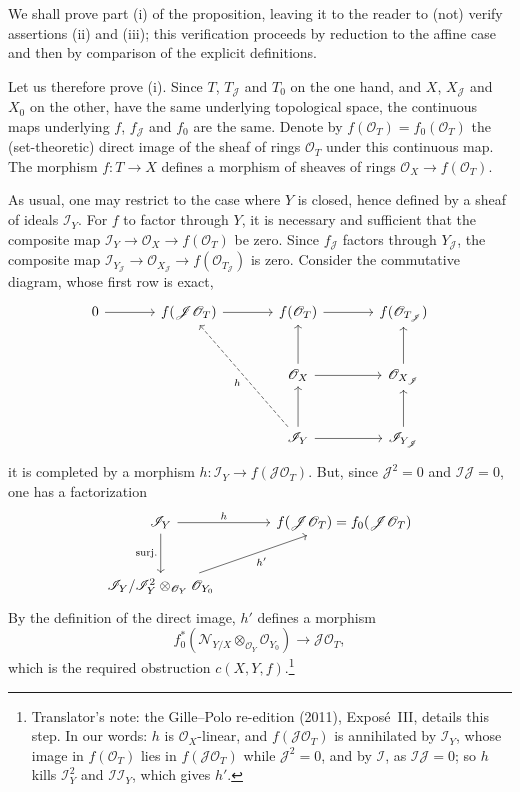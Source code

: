 We shall prove part (i) of the proposition, leaving it to the reader to
(not) verify assertions (ii) and (iii); this verification proceeds by
reduction to the affine case and then by comparison of the explicit
definitions.

Let us therefore prove (i). Since \(T\), \(T_{\mathscr J}\) and \(T_0\) on the
one hand, and \(X\), \(X_{\mathscr J}\) and \(X_0\) on the other, have the same
underlying topological space, the continuous maps underlying \(f\),
\(f_{\mathscr J}\) and \(f_0\) are the same. Denote by
\(f(\mathscr O_T)=f_0(\mathscr O_T)\) the (set-theoretic) direct image of the
sheaf of rings \(\mathscr O_T\) under this continuous map. The morphism
\(f:T\to X\) defines a morphism of sheaves of rings
\(\mathscr O_X\to f(\mathscr O_T)\).

As usual, one may restrict to the case where \(Y\) is closed, hence defined by
a sheaf of ideals \(\mathscr I_Y\). For \(f\) to factor through \(Y\), it is
necessary and sufficient that the composite map
\(\mathscr I_Y\to\mathscr O_X\to f(\mathscr O_T)\) be zero. Since
\(f_{\mathscr J}\) factors through \(Y_{\mathscr J}\), the composite map
\(\mathscr I_{Y_{\mathscr J}}\to\mathscr O_{X_{\mathscr J}}\to
f(\mathscr O_{T_{\mathscr J}})\) is zero. Consider the commutative diagram, whose
first row is exact,
\[
\begin{tikzcd}[column sep=large,row sep=large]
 0\arrow[r]&f(\mathscr J\mathscr O_T)\arrow[r]&f(\mathscr O_T)\arrow[r]
   &f(\mathscr O_{T_{\mathscr J}})\\
 &&\mathscr O_X\arrow[u]\arrow[r]&\mathscr O_{X_{\mathscr J}}\arrow[u]\\
 &&\mathscr I_Y\arrow[u]\arrow[r]\arrow[uul,dashed,"h"]
   &\mathscr I_{Y_{\mathscr J}}\arrow[u]
\end{tikzcd}
\]
it is completed by a morphism \(h:\mathscr I_Y\to f(\mathscr J\mathscr O_T)\).
But, since \(\mathscr J^2=0\) and \(\mathscr I\mathscr J=0\), one has a
factorization
\[
\begin{tikzcd}[column sep=large,row sep=large]
 \mathscr I_Y\arrow[r,"h"]\arrow[d,"\mathrm{surj.}"']
   &f(\mathscr J\mathscr O_T)=f_0(\mathscr J\mathscr O_T)\\
 \mathscr I_Y/\mathscr I_Y^2\otimes_{\mathscr O_Y}\mathscr O_{Y_0}
   \arrow[ur,"h'"']&
\end{tikzcd}
\]
By the definition of the direct image, \(h'\) defines a morphism
\[
 f_0^*(\mathscr N_{Y/X}\otimes_{\mathscr O_Y}\mathscr O_{Y_0})
 \longrightarrow\mathscr J\mathscr O_T,
\]
which is the required obstruction \(c(X,Y,f)\).\footnote{Translator's note: the Gille--Polo re-edition (2011), Exposé~III,
details this step. In our words: \(h\) is \(\mathscr O_X\)-linear, and
\(f(\mathscr J\mathscr O_T)\) is annihilated by \(\mathscr I_Y\), whose image in
\(f(\mathscr O_T)\) lies in \(f(\mathscr J\mathscr O_T)\) while
\(\mathscr J^2=0\), and by \(\mathscr I\), as \(\mathscr I\mathscr J=0\); so
\(h\) kills \(\mathscr I_Y^2\) and \(\mathscr I\mathscr I_Y\), which gives
\(h'\).}

